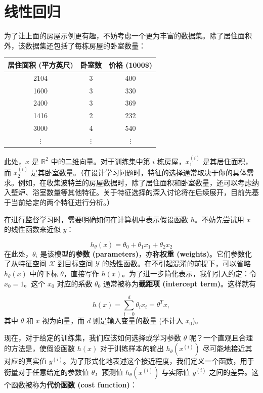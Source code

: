 \chapter{线性回归}

为了让上面的房屋示例更有趣，不妨考虑一个更为丰富的数据集。除了居住面积外，该数据集还包括了每栋房屋的卧室数量：

\begin{table}[H]
    \centering
    \begin{tabular}{c|c|c}
        居住面积 (平方英尺) & 卧室数 & 价格 (1000\$) \\
        \hline
        2104 & 3 & 400 \\
        1600 & 3 & 330 \\
        2400 & 3 & 369 \\
        1416 & 2 & 232 \\
        3000 & 4 & 540 \\
        $\vdots$ & $\vdots$ & $\vdots$
    \end{tabular}
    \label{tab:house_example2}
\end{table}

此处，$x$ 是 $\mathbb{R}^2$ 中的二维向量。对于训练集中第 $i$ 栋房屋，$x_1^{(i)}$ 是其居住面积，而 $x_2^{(i)}$ 是其卧室数量。（在设计学习问题时，特征的选择通常取决于你的具体需求。例如，在收集波特兰的房屋数据时，除了居住面积和卧室数量，还可以考虑纳入壁炉、浴室数量等其他特征。关于特征选择的深入讨论将在后续展开，目前先基于当前给定的两个特征进行分析。）

在进行监督学习时，需要明确如何在计算机中表示假设函数 $h$。不妨先尝试用 $x$ 的线性函数来近似 $y$：

\[
    h_\theta(x) = \theta_0 + \theta_1x_1 + \theta_2x_2
\]
在此处，$\theta_i$ 是该模型的\textbf{参数 (parameters)}，亦称\textbf{权重 (weights)}。它们参数化了从特征空间 $\mathcal{X}$ 到目标空间 $\mathcal{Y}$ 的线性函数。在不引起混淆的前提下，可以省略 $h_\theta(x)$ 中的下标 $\theta$，直接写作 $h(x)$。为了进一步简化表示，我们引入约定：令 $x_0 = 1$。这个 $x_0$ 对应的系数 $\theta_0$ 通常被称为\textbf{截距项 (intercept term)}。这样就有

\[
    h(x) = \sum_{i=0}^d \theta_i x_i = \theta^T x,
\]
其中 $\theta$ 和 $x$ 视为向量，而 $d$ 则是输入变量的数量 (不计入 $x_0$)。

现在，对于给定的训练集，我们应该如何选择或学习参数 $\theta$ 呢？一个直观且合理的方法是，使假设函数 $h(x)$ 对于训练样本的输出 $h_\theta(x^{(i)})$ 尽可能地接近其对应的真实值 $y^{(i)}$。为了形式化地表述这个接近程度，我们定义一个函数，用于衡量对于任意给定的参数值 $\theta$，预测值 $h_\theta(x^{(i)})$ 与实际值 $y^{(i)}$ 之间的差异。这个函数被称为\textbf{代价函数 (cost function)}：

